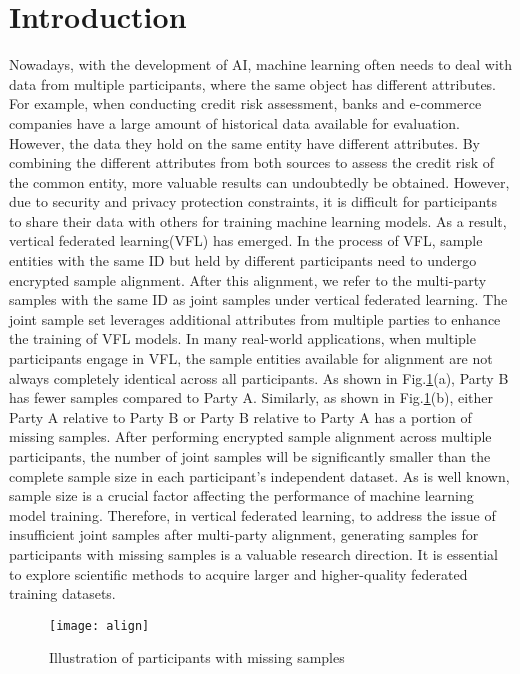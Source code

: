 \documentclass[final,1p,times]{elsarticle}
\begin{document}


\section{Introduction}
\label{sec1}

Nowadays, with the development of AI, machine learning often needs to deal with data from multiple participants, where the same object has different attributes. For example, when conducting credit risk assessment, banks and e-commerce companies have a large amount of historical data available for evaluation. However, the data they hold on the same entity have different attributes. By combining the different attributes from both sources to assess the credit risk of the common entity, more valuable results can undoubtedly be obtained. However, due to security and privacy protection constraints, it is difficult for participants to share their data with others for training machine learning models. As a result, vertical federated learning(VFL) has emerged. In the process of VFL, sample entities with the same ID but held by different participants need to undergo encrypted sample alignment. After this alignment, we refer to the multi-party samples with the same ID as joint samples under vertical federated learning. The joint sample set leverages additional attributes from multiple parties to enhance the training of VFL models. In many real-world applications, when multiple participants engage in VFL, the sample entities available for alignment are not always completely identical across all participants. As shown in Fig.\ref{fig:align}(a), Party B has fewer samples compared to Party A. Similarly, as shown in Fig.\ref{fig:align}(b), either Party A relative to Party B or Party B relative to Party A has a portion of missing samples. After performing encrypted sample alignment across multiple participants, the number of joint samples will be significantly smaller than the complete sample size in each participant's independent dataset. As is well known, sample size is a crucial factor affecting the performance of machine learning model training. Therefore, in vertical federated learning, to address the issue of insufficient joint samples after multi-party alignment, generating samples for participants with missing samples is a valuable research direction. It is essential to explore scientific methods to acquire larger and higher-quality federated training datasets.
\begin{figure}[t]
	\centering 
	\texttt{[image: align]}
	\caption{Illustration of participants with missing samples} 
	\label{fig:align}
\end{figure}
\end{document}
